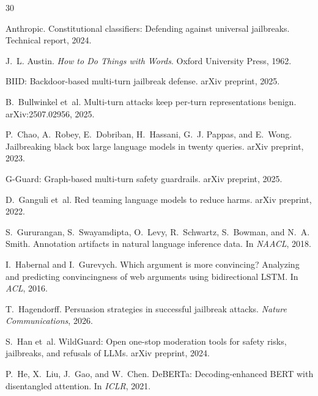 \documentclass[11pt,a4paper]{article}
\begin{document}
\begin{thebibliography}{30}

Anthropic.
\newblock Constitutional classifiers: Defending against universal jailbreaks.
\newblock Technical report, 2024.

J.~L. Austin.
\newblock \emph{How to Do Things with Words}.
\newblock Oxford University Press, 1962.

BIID: Backdoor-based multi-turn jailbreak defense.
\newblock arXiv preprint, 2025.

B.~Bullwinkel et~al.
\newblock Multi-turn attacks keep per-turn representations benign.
\newblock arXiv:2507.02956, 2025.

P.~Chao, A.~Robey, E.~Dobriban, H.~Hassani, G.~J. Pappas, and E.~Wong.
\newblock Jailbreaking black box large language models in twenty queries.
\newblock arXiv preprint, 2023.

G-Guard: Graph-based multi-turn safety guardrails.
\newblock arXiv preprint, 2025.

D.~Ganguli et~al.
\newblock Red teaming language models to reduce harms.
\newblock arXiv preprint, 2022.

S.~Gururangan, S.~Swayamdipta, O.~Levy, R.~Schwartz, S.~Bowman, and N.~A. Smith.
\newblock Annotation artifacts in natural language inference data.
\newblock In \emph{NAACL}, 2018.

I.~Habernal and I.~Gurevych.
\newblock Which argument is more convincing? Analyzing and predicting convincingness of web arguments using bidirectional LSTM.
\newblock In \emph{ACL}, 2016.

T.~Hagendorff.
\newblock Persuasion strategies in successful jailbreak attacks.
\newblock \emph{Nature Communications}, 2026.

S.~Han et~al.
\newblock WildGuard: Open one-stop moderation tools for safety risks, jailbreaks, and refusals of LLMs.
\newblock arXiv preprint, 2024.

P.~He, X.~Liu, J.~Gao, and W.~Chen.
\newblock DeBERTa: Decoding-enhanced BERT with disentangled attention.
\newblock In \emph{ICLR}, 2021.


\end{thebibliography}
\end{document}
